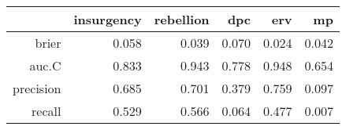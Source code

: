 \begin{tabular}{rrrrrr}
  \hline
 & insurgency & rebellion & dpc & erv & mp \\ 
  \hline
brier & 0.058 & 0.039 & 0.070 & 0.024 & 0.042 \\ 
  auc.C & 0.833 & 0.943 & 0.778 & 0.948 & 0.654 \\ 
  precision & 0.685 & 0.701 & 0.379 & 0.759 & 0.097 \\ 
  recall & 0.529 & 0.566 & 0.064 & 0.477 & 0.007 \\ 
   \hline
\end{tabular}
